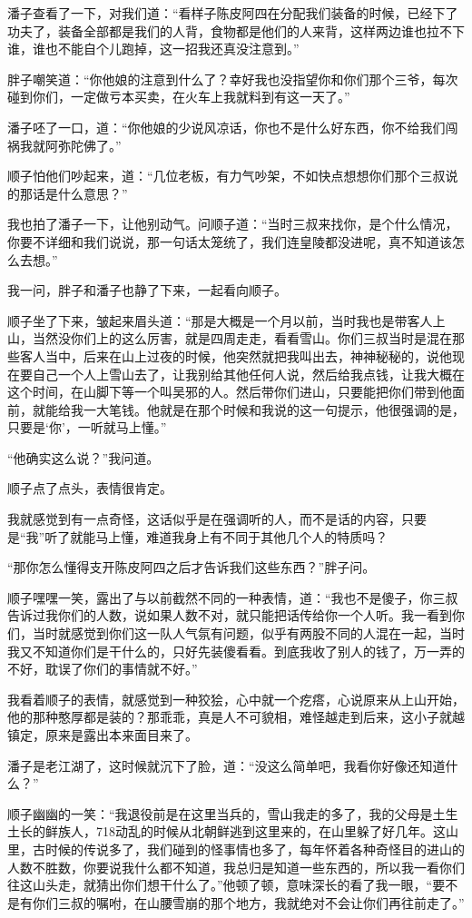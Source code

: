 潘子查看了一下，对我们道：“看样子陈皮阿四在分配我们装备的时候，已经下了功夫了，装备全部都是我们的人背，食物都是他们的人来背，这样两边谁也拉不下谁，谁也不能自个儿跑掉，这一招我还真没注意到。”

胖子嘲笑道：“你他娘的注意到什么了？幸好我也没指望你和你们那个三爷，每次碰到你们，一定做亏本买卖，在火车上我就料到有这一天了。”

潘子呸了一口，道：“你他娘的少说风凉话，你也不是什么好东西，你不给我们闯祸我就阿弥陀佛了。”

顺子怕他们吵起来，道：“几位老板，有力气吵架，不如快点想想你们那个三叔说的那话是什么意思？”

我也拍了潘子一下，让他别动气。问顺子道：“当时三叔来找你，是个什么情况，你要不详细和我们说说，那一句话太笼统了，我们连皇陵都没进呢，真不知道该怎么去想。”

我一问，胖子和潘子也静了下来，一起看向顺子。

顺子坐了下来，皱起来眉头道：“那是大概是一个月以前，当时我也是带客人上山，当然没你们上的这么厉害，就是四周走走，看看雪山。你们三叔当时是混在那些客人当中，后来在山上过夜的时候，他突然就把我叫出去，神神秘秘的，说他现在要自己一个人上雪山去了，让我别给其他任何人说，然后给我点钱，让我大概在这个时间，在山脚下等一个叫吴邪的人。然后带你们进山，只要能把你们带到他面前，就能给我一大笔钱。他就是在那个时候和我说的这一句提示，他很强调的是，只要是‘你’，一听就马上懂。”

“他确实这么说？”我问道。

顺子点了点头，表情很肯定。

我就感觉到有一点奇怪，这话似乎是在强调听的人，而不是话的内容，只要是“我”听了就能马上懂，难道我身上有不同于其他几个人的特质吗？

“那你怎么懂得支开陈皮阿四之后才告诉我们这些东西？”胖子问。

顺子嘿嘿一笑，露出了与以前截然不同的一种表情，道：“我也不是傻子，你三叔告诉过我你们的人数，说如果人数不对，就只能把话传给你一个人听。我一看到你们，当时就感觉到你们这一队人气氛有问题，似乎有两股不同的人混在一起，当时我又不知道你们是干什么的，只好先装傻看看。到底我收了别人的钱了，万一弄的不好，耽误了你们的事情就不好。”

我看着顺子的表情，就感觉到一种狡狯，心中就一个疙瘩，心说原来从上山开始，他的那种憨厚都是装的？那乖乖，真是人不可貌相，难怪越走到后来，这小子就越镇定，原来是露出本来面目来了。

潘子是老江湖了，这时候就沉下了脸，道：“没这么简单吧，我看你好像还知道什么？”

顺子幽幽的一笑：“我退役前是在这里当兵的，雪山我走的多了，我的父母是土生土长的鲜族人，718动乱的时候从北朝鲜逃到这里来的，在山里躲了好几年。这山里，古时候的传说多了，我们碰到的怪事情也多了，每年怀着各种奇怪目的进山的人数不胜数，你要说我什么都不知道，我总归是知道一些东西的，所以我一看你们往这山头走，就猜出你们想干什么了。”他顿了顿，意味深长的看了我一眼，“要不是有你们三叔的嘱咐，在山腰雪崩的那个地方，我就绝对不会让你们再往前走了。”

